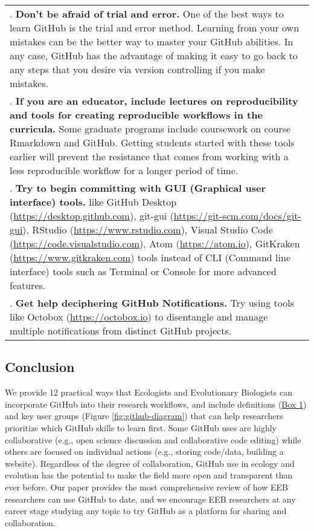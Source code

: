 \begin{tablenos:no-prefix-table-caption}
\begin{longtable}[]{@{}
  >{\raggedright\arraybackslash}p{}@{}}
7. \textbf{Don't be afraid of trial and error.} One of the best ways to learn GitHub is the trial and error method. Learning from your own mistakes can be the better way to master your GitHub abilities. In any case, GitHub has the advantage of making it easy to go back to any steps that you desire via version controlling if you make mistakes. \\
8. \textbf{If you are an educator, include lectures on reproducibility and tools for creating reproducible workflows in the curricula.} Some graduate programs include coursework on course Rmarkdown and GitHub. Getting students started with these tools earlier will prevent the resistance that comes from working with a less reproducible workflow for a longer period of time. \\
9. \textbf{Try to begin committing with GUI (Graphical user interface) tools.} like GitHub Desktop (\url{https://desktop.github.com}), git-gui (\url{https://git-scm.com/docs/git-gui}), RStudio (\url{https://www.rstudio.com}), Visual Studio Code (\url{https://code.visualstudio.com}), Atom (\url{https://atom.io}), GitKraken (\url{https://www.gitkraken.com}) tools instead of CLI (Command line interface) tools such as Terminal or Console for more advanced features. \\
10. \textbf{Get help deciphering GitHub Notifications.} Try using tools like Octobox (\url{https://octobox.io}) to disentangle and manage multiple notifications from distinct GitHub projects. \\
\bottomrule
\end{longtable}

\end{tablenos:no-prefix-table-caption}

\hypertarget{conclusion}{%
\subsection{Conclusion}\label{conclusion}}

We provide 12 practical ways that Ecologists and Evolutionary Biologists can incorporate GitHub into their research workflows, and include definitions (\protect\hyperlink{definitions}{Box 1}) and key user groups (Figure \ref{fig:github-diagram}) that can help researchers prioritize which GitHub skills to learn first.
Some GitHub uses are highly collaborative (e.g., open science discussion and collaborative code editing) while others are focused on individual actions (e.g., storing code/data, building a website).
Regardless of the degree of collaboration, GitHub use in ecology and evolution has the potential to make the field more open and transparent than ever before.
Our paper provides the most comprehensive review of how EEB researchers can use GitHub to date, and we encourage EEB researchers at any career stage studying any topic to try GitHub as a platform for sharing and collaboration.

